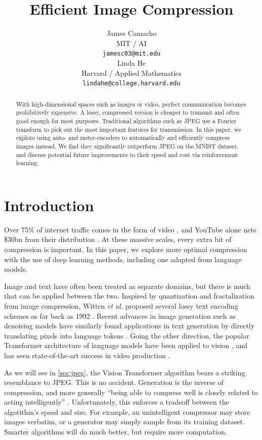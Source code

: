 \documentclass[11pt]{article}
\title{Efficient Image Compression}
\author{James Camacho \\
  MIT / AI \\
  \texttt{jamesc03@mit.edu} \\\And
  Linda He \\
  Harvard / Applied Mathematics \\
  \texttt{lindahe@college.harvard.edu} \\}
\begin{document}
\maketitle
\begin{abstract}
  With high-dimensional spaces such as images or video, perfect communication becomes prohibitively expensive. A lossy, compressed version is cheaper to transmit and often good enough for most purposes. Traditional algorithms such as JPEG use a Fourier transform to pick out the most important features for transmission. In this paper, we explore using auto- and raster-encoders to automatically and efficiently compress images instead. We find they significantly outperform JPEG on the MNIST dataset, and discuss potential future improvements to their speed and cost via reinforcement learning.
\end{abstract}


\section{Introduction}

Over 75\% of internet traffic comes in the form of video \citep{cisco-2018-traffic}, and YouTube alone nets \$30bn from their distribution \citep{alphabet-2024-earnings}. At these massive scales, every extra bit of compression is important. In this paper, we explore more optimal compression with the use of deep learning methods, including one adapted from language models.

Image and text have often been treated as separate domains, but there is much that can be applied between the two. Inspired by quantization and fractalization from image compression, Witten \textit{et al.} proposed several lossy text encoding schemes as far back as 1992 \citep{witten-etal-1992-lossy}. Recent advances in image generation such as denoising models \citep{ho-2020-denoising} have similarly found applications in text generation by directly translating pixels into language tokens \citep{kou-2024-cllms}. Going the other direction, the popular Transformer architecture of language models have been applied to vision \citep{dosovitskiy-2021-vit}, and has seen state-of-the-art success in video production \citep{liu-2024-sora}.

As we will see in \ref{sec:jpeg}, the Vision Transformer algorithm bears a striking resemblance to JPEG. This is no accident. Generation is the inverse of compression, and more generally ``being able to compress well is closely related to acting intelligently'' \citep{hutter-2020}. Unfortunately, this enforces a tradeoff between the algorithm's speed and size. For example, an unintelligent compressor may store images verbatim, or a generator may simply sample from its training dataset. Smarter algorithms will do much better, but require more computation.
\end{document}
